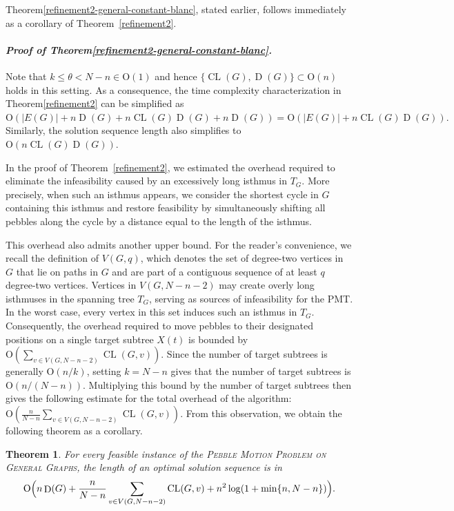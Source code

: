 \documentclass[letter,11pt]{article}
\newtheorem{thm}{Theorem}
\newcommand{\white}{\qquad{\framebox{\rule{0pt}{4pt}}}}
\newcommand{\owari}{\hfill\white}
\theoremstyle{definition}
\theoremstyle{definition}
\DeclareMathOperator{\D}{D}
\DeclareMathOperator{\CL}{CL}
\newcommand{\1}{\boldmath$~1~$\unboldmath}
\newcommand{\Ord}{\mathrm{O}}
\newcommand{\qedgo}{\vspace{0.35cm}}
\newcommand{\tume}{\hspace*{0.2em}}
\newenvironment{Proofof}[1]{\expandafter
\paragraph{{\it Proof of #1.}}}{\hspace{5mm}\owari\qedgo}
\begin{document}
Theorem\tume\ref{refinement2-general-constant-blanc}, stated earlier, follows 
immediately as a corollary of Theorem~\ref{refinement2}.
\begin{Proofof}{Theorem\tume\ref{refinement2-general-constant-blanc}}
Note that $k \leq \theta < N-n \in \Ord(1)$ and hence $\{\CL(G), \D(G)\} \subset \Ord(n)$ holds in this setting.  
As a consequence, the time complexity characterization in Theorem\tume\ref{refinement2} can be simplified as 
$\Ord(|E(G)| + n\D(G)+ n \CL(G) \D(G) + n\D(G))=\Ord(|E(G)| + n \CL(G) \D(G)). $
Similarly, the solution sequence length also simplifies to $\Ord(n \CL(G) \D(G))$.
\end{Proofof}

In the proof of Theorem~\ref{refinement2}, we estimated the overhead required to eliminate the infeasibility 
caused by an excessively long isthmus in $T_G$.
More precisely, when such an isthmus appears, we consider the shortest cycle in $G$ containing this isthmus 
and restore feasibility by simultaneously shifting all pebbles along the cycle by a distance equal to the length 
of the isthmus.

This overhead also admits another upper bound.
For the reader's convenience, we recall the definition of $V(G, q)$, which denotes the set of degree-two vertices in $G$ 
that lie on paths in $G$ and are part of a contiguous sequence of at least $q$ degree-two vertices.
Vertices in $V(G, N-n-2)$ may create overly long isthmuses in the spanning tree $T_G$, serving as sources of infeasibility for the PMT.  
In the worst case, every vertex in this set induces such an isthmus in $T_G$. 
Consequently, the overhead required to move pebbles to their designated positions on a single target subtree $X(t)$ is bounded by
$\Ord\!\left(\sum_{v \in V(G, N-n-2)} \CL(G, v)\right)$.
Since the number of target subtrees is generally $\Ord(n/k)$,
setting $k = N-n$ gives that the number of target subtrees is $\Ord(n/(N-n))$.
Multiplying this bound by the number of target subtrees then gives the following estimate for the total overhead of the algorithm:
$\Ord\!\left(\frac{n}{N-n} \sum_{v\in V(G,N-n-2)} \CL(G,v)\right)$.
From this observation, we obtain the following theorem as a corollary.
\begin{thm}\label{refinement3}
For every feasible instance of the \textsc{Pebble Motion Problem on General Graphs}, 
the length of an optimal solution sequence is in 
$$\Ord\Bigl(n\D(G) + \frac{n}{N-n}\sum_{v\in V(G,N-n-2)} \CL(G,v) + n^2 \log(1+\min\{n, N-n\})\Bigr).$$
\end{thm}
\end{document}
